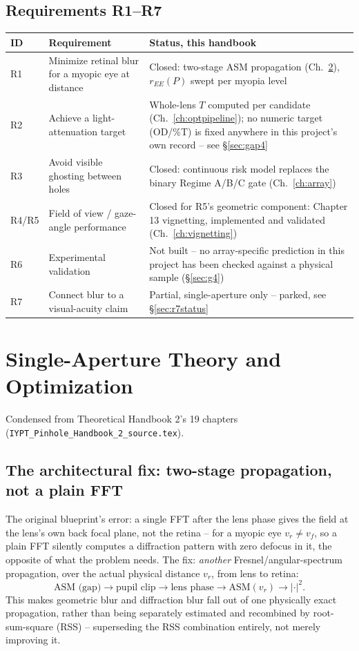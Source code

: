 \documentclass[11pt]{report}
\newcommand{\vr}{v_r}
\newcommand{\vf}{v_f}
\begin{document}
\section{Requirements R1--R7}
\begin{longtable}{p{1.1cm}p{6.3cm}p{7.7cm}}
\toprule
\textbf{ID} & \textbf{Requirement} & \textbf{Status, this handbook} \\
\midrule
\endhead
R1 & Minimize retinal blur for a myopic eye at distance & Closed: two-stage ASM propagation
(Ch.~\ref{ch:single}), $r_{EE}(P)$ swept per myopia level \\
R2 & Achieve a light-attenuation target & Whole-lens $T$ computed per candidate
(Ch.~\ref{ch:optpipeline}); no numeric target (OD/\%T) is fixed anywhere in this project's
own record -- see \S\ref{sec:gap4} \\
R3 & Avoid visible ghosting between holes & Closed: continuous risk model replaces the binary
Regime A/B/C gate (Ch.~\ref{ch:array}) \\
R4/R5 & Field of view / gaze-angle performance & Closed for R5's geometric component:
Chapter 13 vignetting, implemented and validated (Ch.~\ref{ch:vignetting}) \\
R6 & Experimental validation & Not built -- no array-specific prediction in this project has
been checked against a physical sample (\S\ref{sec:g4}) \\
R7 & Connect blur to a visual-acuity claim & Partial, single-aperture only -- parked, see
\S\ref{sec:r7status} \\
\bottomrule
\end{longtable}

\chapter{Single-Aperture Theory and Optimization}
\label{ch:single}
Condensed from Theoretical Handbook 2's 19 chapters (\texttt{IYPT\_Pinhole\_Handbook\_2\_source.tex}).

\section{The architectural fix: two-stage propagation, not a plain FFT}
The original blueprint's error: a single FFT after the lens phase gives the field at the
lens's own back focal plane, not the retina -- for a myopic eye $\vr \neq \vf$, so a plain
FFT silently computes a diffraction pattern with zero defocus in it, the opposite of what the
problem needs. The fix: \emph{another} Fresnel/angular-spectrum propagation, over the actual
physical distance $\vr$, from lens to retina:
\[
\text{ASM (gap)} \to \text{pupil clip} \to \text{lens phase} \to \text{ASM}(\vr) \to
|\cdot|^2.
\]
This makes geometric blur and diffraction blur fall out of one physically exact propagation,
rather than being separately estimated and recombined by root-sum-square (RSS) -- superseding
the RSS combination entirely, not merely improving it.
\end{document}
